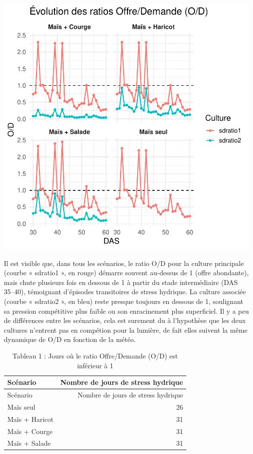 \documentclass[
]{article}
\begin{document}
\begin{center}\includegraphics[width=0.7\linewidth]{Rapport_final_Maxime_CORNEZ_files/figure-latex/graphe-od-facets-1} \end{center}

Il est visible que, dans tous les scénarios, le ratio O/D pour la
culture principale (courbe « sdratio1 », en rouge) démarre souvent
au-dessus de 1 (offre abondante), mais chute plusieurs fois en dessous
de 1 à partir du stade intermédiaire (DAS 35--40), témoignant d'épisodes
transitoires de stress hydrique. La culture associée (courbe « sdratio2
», en bleu) reste presque toujours en dessous de 1, soulignant sa
pression compétitive plus faible ou son enracinement plus superficiel.
Il y a peu de différences entre les scénarios, cela est surement du à
l'hypothèse que les deux cultures n'entrent pas en compétion pour la
lumière, de fait elles suivent la même dynamique de O/D en fonction de
la météo.

\begin{longtable}[]{@{}lr@{}}
\caption{Tableau 1 : Jours où le ratio Offre/Demande (O/D) est inférieur
à 1}\tabularnewline
\toprule\noalign{}
Scénario & Nombre de jours de stress hydrique \\
\midrule\noalign{}
\endfirsthead
\toprule\noalign{}
Scénario & Nombre de jours de stress hydrique \\
\midrule\noalign{}
\endhead
\bottomrule\noalign{}
\endlastfoot
Maïs seul & 26 \\
Maïs + Haricot & 31 \\
Maïs + Courge & 31 \\
Maïs + Salade & 31 \\
\end{longtable}
\end{document}

